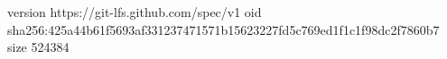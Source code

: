 version https://git-lfs.github.com/spec/v1
oid sha256:425a44b61f5693af331237471571b15623227fd5c769ed1f1c1f98dc2f7860b7
size 524384
